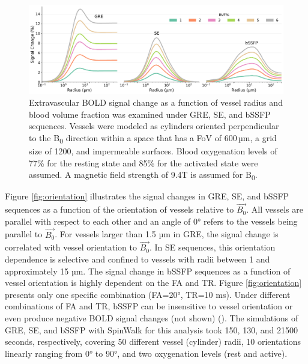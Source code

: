 \begin{figure}[!htbp]
    \centering
    \includegraphics[width=\textwidth]{fig3_BVF.pdf}
    \caption{\protect Extravascular BOLD signal change as a function of vessel radius and blood volume fraction was examined under GRE, SE, and bSSFP sequences. Vessels were modeled as cylinders oriented perpendicular to the B\textsubscript{0} direction within a space that has a FoV of 600\,µm, a grid size of 1200, and impermeable surfaces. Blood oxygenation levels of 77\% for the resting state and 85\% for the activated state were assumed. A magnetic field strength of 9.4T is assumed for B\textsubscript{0}. }
    \label{fig:BVF}
\end{figure}

Figure \ref{fig:orientation} illustrates the signal changes in GRE, SE, and bSSFP sequences as a function of the orientation of vessels relative to $\Vec{B_0}$. All vessels are parallel with respect to each other and an angle of 0° refers to the vessels being parallel to $\Vec{B_0}$. For vessels larger than 1.5 µm in GRE, the signal change is correlated with vessel orientation to $\Vec{B_0}$. In SE sequences, this orientation dependence is selective and confined to vessels with radii between 1 and approximately 15 µm. The signal change in bSSFP sequences as a function of vessel orientation is highly dependent on the FA and TR. Figure \ref{fig:orientation} presents only one specific combination (FA=20°, TR=10 ms). Under different combinations of FA and TR, bSSFP can be insensitive to vessel orientation or even produce negative BOLD signal changes (not shown) (\cite{scheffler2016high}). The simulations of GRE, SE, and bSSFP with SpinWalk for this analysis took 150, 130, and 21500 seconds, respectively, covering 50 different vessel (cylinder) radii, 10 orientations linearly ranging from 0° to 90°, and two oxygenation levels (rest and active).


